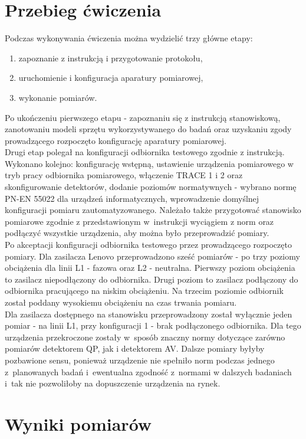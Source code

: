 \documentclass[12pt, a4paper, oneside]{article}
\begin{document}
\section{Przebieg ćwiczenia}
\indent\indent Podczas wykonywania ćwiczenia można wydzielić trzy główne etapy:
\begin{enumerate}
\item zapoznanie z instrukcją i przygotowanie protokołu,
\item uruchomienie i konfiguracja aparatury pomiarowej,
\item wykonanie pomiarów.
\end{enumerate}
\indent\indent Po ukończeniu pierwszego etapu - zapoznaniu się z instrukcją stanowiskową, zanotowaniu modeli sprzętu wykorzystywanego do badań oraz uzyskaniu zgody prowadzącego rozpoczęto konfigurację aparatury pomiarowej.\\
\indent Drugi etap polegał na konfiguracji odbiornika testowego zgodnie z instrukcją. Wykonano kolejno: konfigurację wstępną, ustawienie urządzenia pomiarowego w tryb pracy odbiornika pomiarowego, włączenie TRACE 1 i 2 oraz skonfigurowanie detektorów, dodanie poziomów normatywnych - wybrano normę PN-EN 55022 dla urządzeń informatycznych, wprowadzenie domyślnej konfiguracji pomiaru zautomatyzowanego. Należało także przygotować stanowisko pomiarowe zgodnie z przedstawionym w~instrukcji wyciągiem z norm oraz podłączyć wszystkie urządzenia, aby można było przeprowadzić pomiary.\\
\indent Po akceptacji konfiguracji odbiornika testowego przez prowadzącego rozpoczęto pomiary. Dla zasilacza Lenovo przeprowadzono sześć pomiarów - po trzy poziomy obciążenia dla linii L1 - fazowa oraz L2 - neutralna. Pierwszy poziom obciążenia to zasilacz niepodłączony do odbiornika. Drugi poziom to zasilacz podłączony do odbiornika pracującego na niskim obciążeniu. Na trzecim poziomie odbiornik został poddany wysokiemu obciążeniu na czas trwania pomiaru.\\
Dla zasilacza dostępnego na stanowisku przeprowadzony został wyłącznie jeden pomiar - na linii L1, przy konfiguracji 1 - brak podłączonego odbiornika. Dla tego urządzenia przekroczone zostały w~sposób znaczny normy dotyczące zarówno pomiarów detektorem QP, jak i detektorem AV. Dalsze pomiary byłyby pozbawione sensu, ponieważ urządzenie nie spełniło norm podczas jednego z~planowanych badań i~ewentualna zgodność z~normami w dalszych badaniach i~tak nie pozwoliłoby na dopuszczenie urządzenia na rynek.
\clearpage
\section{Wyniki pomiarów}
\end{document}
